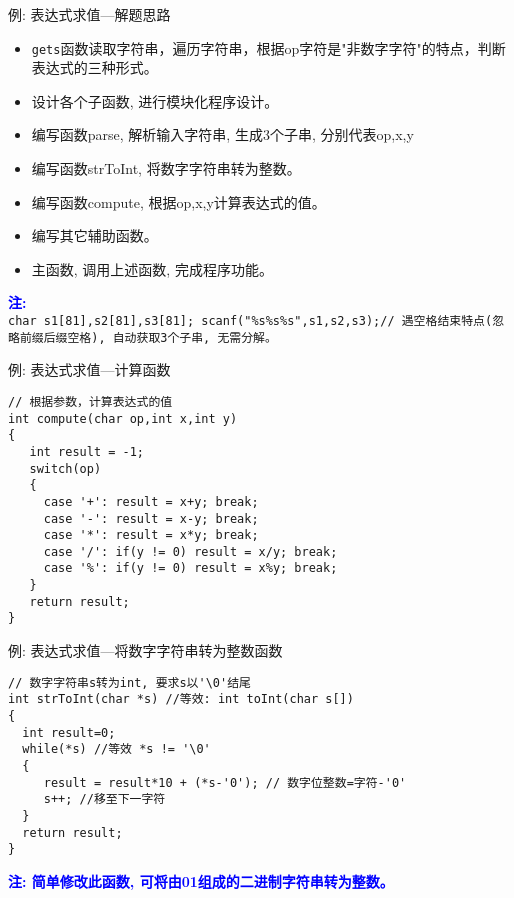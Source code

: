 \begin{frame}{例: 表达式求值---解题思路}
\vspace{-0.5cm}
\begin{itemize}
	\item \lstinline|gets|函数读取字符串，遍历字符串，根据op字符是"非数字字符"的特点，判断表达式的三种形式。\\
	\item 设计各个子函数, 进行模块化程序设计。
	\item 编写函数parse, 解析输入字符串, 生成3个子串, 分别代表op,x,y
	\item 编写函数strToInt, 将数字字符串转为整数。
	\item 编写函数compute, 根据op,x,y计算表达式的值。
	\item 编写其它辅助函数。
	\item 主函数, 调用上述函数, 完成程序功能。
\end{itemize}
\textbf{\textcolor{blue}{注:}}\\
	 \lstinline|char s1[81],s2[81],s3[81]; scanf("%s%s%s",s1,s2,s3);// 遇空格结束特点(忽略前缀后缀空格), 自动获取3个子串, 无需分解。|
\end{frame}

\begin{frame}{例: 表达式求值---计算函数}
\begin{lstlisting}
// 根据参数，计算表达式的值 
int compute(char op,int x,int y)
{
   int result = -1;
   switch(op)
   {
     case '+': result = x+y; break;
     case '-': result = x-y; break;
     case '*': result = x*y; break;
     case '/': if(y != 0) result = x/y; break;
     case '%': if(y != 0) result = x%y; break;
   }
   return result;
}
\end{lstlisting}
\end{frame}

\begin{frame}{例: 表达式求值---将数字字符串转为整数函数}
\begin{lstlisting}
// 数字字符串s转为int, 要求s以'\0'结尾 
int strToInt(char *s) //等效: int toInt(char s[]) 
{
  int result=0;
  while(*s) //等效 *s != '\0'
  {
     result = result*10 + (*s-'0'); // 数字位整数=字符-'0'
     s++; //移至下一字符 
  }
  return result;
} 
\end{lstlisting}
\textbf{\textcolor{blue}{注: 简单修改此函数, 可将由01组成的二进制字符串转为整数。}}
\end{frame}

